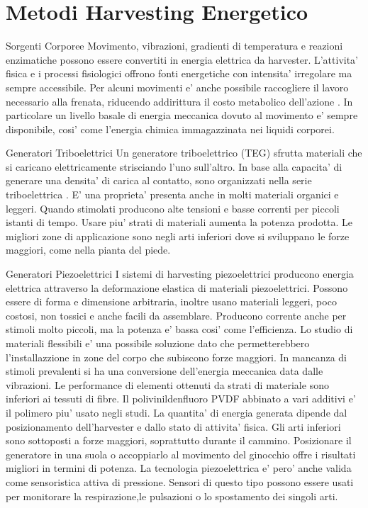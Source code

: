 \chapter{Metodi Harvesting Energetico}

\begin{section}{Sorgenti Corporee}
   Movimento, vibrazioni, gradienti di temperatura e reazioni enzimatiche possono essere convertiti in energia elettrica da harvester. L'attivita' fisica e i processi fisiologici offrono fonti energetiche con intensita' irregolare ma sempre accessibile. Per alcuni movimenti e' anche possibile raccogliere il lavoro necessario alla frenata, riducendo addirittura il costo metabolico dell'azione \cite{liuBiomechanicalEnergyHarvesting2022}. In particolare un livello basale di energia meccanica dovuto al movimento e' sempre disponibile, cosi' come l'energia chimica immagazzinata nei liquidi corporei.
   
   \begin{subsection}{Generatori Triboelettrici}
    Un generatore triboelettrico (TEG) sfrutta materiali che si caricano elettricamente strisciando l'uno sull'altro. In base alla capacita' di generare una densita' di carica al contatto, sono organizzati nella serie triboelettrica \cite{zouQuantifyingTriboelectricSeries2019}. E' una proprieta' presenta anche in molti materiali organici e leggeri. Quando stimolati producono alte tensioni e basse correnti per piccoli istanti di tempo. Usare piu' strati di materiali aumenta la potenza prodotta. Le migliori zone di applicazione sono negli arti inferiori dove si sviluppano le forze maggiori, come nella pianta del piede.
   \end{subsection}

   \begin{subsection}{Generatori Piezoelettrici}
    I sistemi di harvesting piezoelettrici producono energia elettrica attraverso la deformazione elastica di materiali piezoelettrici. Possono essere di forma e dimensione arbitraria, inoltre usano materiali leggeri, poco costosi, non tossici e anche facili da assemblare. Producono corrente anche per stimoli molto piccoli, ma la potenza e' bassa cosi' come l'efficienza. Lo studio di materiali flessibili e' una possibile soluzione dato che permetterebbero l'installazzione in zone del corpo che subiscono forze maggiori. In mancanza di stimoli prevalenti si ha una conversione dell'energia meccanica data dalle vibrazioni. Le performance di elementi ottenuti da strati di materiale sono inferiori ai tessuti di fibre. Il polivinildenfluoro PVDF abbinato a vari additivi e' il polimero piu' usato negli studi. La quantita' di energia generata dipende dal posizionamento dell'harvester e dallo stato di attivita' fisica. Gli arti inferiori sono sottoposti a forze maggiori, soprattutto durante il cammino. Posizionare il generatore in una suola o accoppiarlo al movimento del ginocchio offre i risultati migliori in termini di potenza. La tecnologia piezoelettrica e' pero' anche valida come sensoristica attiva di pressione. Sensori di questo tipo possono essere usati per monitorare la respirazione,le pulsazioni o lo spostamento dei singoli arti.
   \end{subsection}


\end{section}
